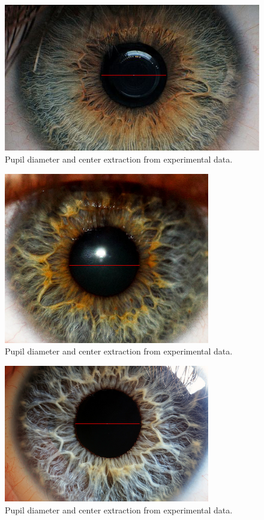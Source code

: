 \documentclass{article}
\begin{document}
\begin{figure}[H]
\centering
\includegraphics[width=\textwidth]{_Figures/raw_data_1_algo_results.png}\hfill
\caption{Pupil diameter and center extraction from experimental data.}
\label{fig:results_1}
\end{figure}

\begin{figure}[H]
\centering
\includegraphics[width=0.8\textwidth]{_Figures/raw_data_3_algo_results.png}\hfill
\caption{Pupil diameter and center extraction from experimental data.}
\label{fig:results_2}
\end{figure}

\begin{figure}[H]
\centering
\includegraphics[width=0.8\textwidth]{_Figures/raw_data_4_algo_results.png}\hfill
\caption{Pupil diameter and center extraction from experimental data.}
\label{fig:results_3}
\end{figure}
\end{document}
